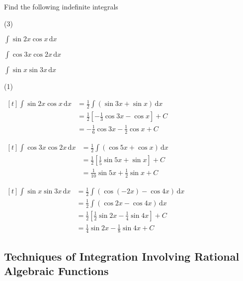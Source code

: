 \documentclass[11pt,a4paper]{book}
\begin{document}
\begin{example}

Find the following indefinite integrals


\begin{tasks}[label=(\alph*),label-width=3.5ex](3)

\task  ${\displaystyle \int\sin2x\cos x\, \mathrm{d}x}$

\task  ${\displaystyle \int\cos3x\cos2x\, \mathrm{d}x}$

\task  ${\displaystyle \int\sin x\sin3x\, \mathrm{d}x}$

\end{tasks}

\Solution

\begin{tasks}[label=(\alph*),label-width=3.5ex,after-item-skip = 1cm](1)

\task
$
\begin{aligned}[t]
\int\sin2x\cos x\, \mathrm{d}x & =\frac{1}{2}\int\left(\sin3x+\sin x\right)\, \mathrm{d}x\\
 & =\frac{1}{2}\left[-\frac{1}{3}\cos3x-\cos x\right]+C\\
 & =-\frac{1}{6}\cos3x-\frac{1}{2}\cos x+C
\end{aligned}
$

\task
$
\begin{aligned}[t]
{\displaystyle \int\cos3x\cos2x\, \mathrm{d}x} & =\frac{1}{2}\int\left(\cos5x+\cos x\right)\, \mathrm{d}x\\
 & =\frac{1}{2}\left[\frac{1}{5}\sin5x+\sin x\right]+C\\
 & =\frac{1}{10}\sin5x+\frac{1}{2}\sin x+C
\end{aligned}
$

\task
$
\begin{aligned}[t]
{\displaystyle \int\sin x\sin3x\, \mathrm{d}x} & =\frac{1}{2}\int\left(\cos(-2x)-\cos4x\right)\, \mathrm{d}x\\
 & =\frac{1}{2}\int\left(\cos2x-\cos4x\right)\, \mathrm{d}x\\
 & =\frac{1}{2}\left[\frac{1}{2}\sin2x-\frac{1}{4}\sin4x\right]+C\\
 & =\frac{1}{4}\sin2x-\frac{1}{8}\sin4x+C
\end{aligned}
$

\end{tasks}

\end{example}


\subsection{Techniques of Integration Involving Rational Algebraic Functions}
\end{document}
